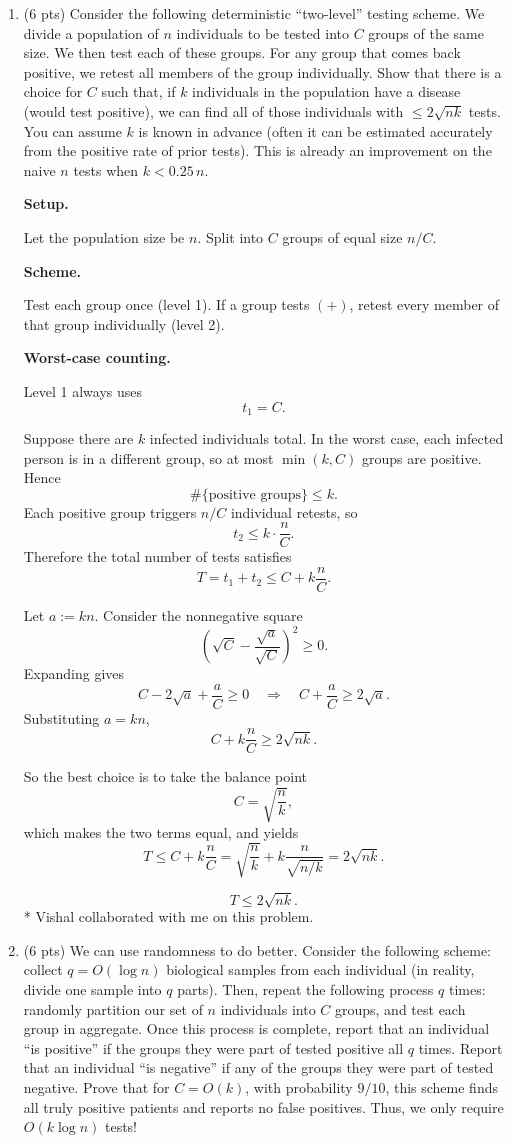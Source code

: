 \documentclass[11pt]{article}
\begin{document}
\begin{enumerate}[label=\arabic*.]
	\item (6 pts) Consider the following deterministic ``two-level'' testing scheme. We divide a population of $n$ individuals to be tested into $C$ groups of the same size. We then test each of these groups. For any group that comes back positive, we retest all members of the group individually. Show that there is a choice for $C$ such that, if $k$ individuals in the population have a disease (would test positive), we can find all of those individuals with $\le 2\sqrt{nk}$ tests. You can assume $k$ is known in advance (often it can be estimated accurately from the positive rate of prior tests). This is already an improvement on the naive $n$ tests when $k<0.25\,n$.

\textbf{Setup.}

Let the population size be $n$. Split into $C$ groups of equal size $n/C$.

\textbf{Scheme.}

Test each group once (level 1).  
If a group tests $(+)$, retest every member of that group individually (level 2).

\textbf{Worst-case counting.}

Level 1 always uses
\[
t_1 = C.
\]

Suppose there are $k$ infected individuals total.  
In the worst case, each infected person is in a different group, so at most $\min(k,C)$ groups are positive. Hence
\[
\#\{\text{positive groups}\} \le k.
\]
Each positive group triggers $n/C$ individual retests, so
\[
t_2 \le k\cdot \frac{n}{C}.
\]
Therefore the total number of tests satisfies
\[
T = t_1+t_2 \le C + k\frac{n}{C}.
\]

Let $a := kn$. Consider the nonnegative square
\[
\left(\sqrt{C}-\frac{\sqrt{a}}{\sqrt{C}}\right)^2 \ge 0.
\]
Expanding gives
\[
C - 2\sqrt{a} + \frac{a}{C} \ge 0
\quad\Longrightarrow\quad
C + \frac{a}{C} \ge 2\sqrt{a}.
\]
Substituting $a=kn$,
\[
C + k\frac{n}{C} \ge 2\sqrt{nk}.
\]

So the best choice is to take the balance point
\[
C = \sqrt{\frac{n}{k}},
\]
which makes the two terms equal, and yields
\[
T \le C + k\frac{n}{C}
= \sqrt{\frac{n}{k}} + k\frac{n}{\sqrt{n/k}}
= 2\sqrt{nk}.
\]

\[
\boxed{T \le 2\sqrt{nk}.}
\]
* Vishal collaborated with me on this problem.

	\item (6 pts) We can use randomness to do better. Consider the following scheme: collect $q=O(\log n)$ biological samples from each individual (in reality, divide one sample into $q$ parts). Then, repeat the following process $q$ times: randomly partition our set of $n$ individuals into $C$ groups, and test each group in aggregate. Once this process is complete, report that an individual ``is positive'' if the groups they were part of tested positive all $q$ times. Report that an individual ``is negative'' if any of the groups they were part of tested negative. Prove that for $C=O(k)$, with probability $9/10$, this scheme finds all truly positive patients and reports no false positives. Thus, we only require $O(k\log n)$ tests!


\end{enumerate}
\end{document}
